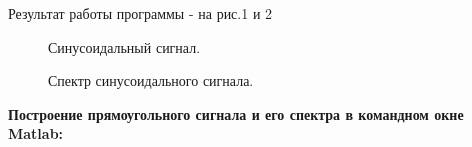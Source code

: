 \documentclass[12pt,a4paper]{report}
\begin{document}
Результат работы программы - на рис.1 и 2\\
\begin{figure}[h!]
\caption{Синусоидальный сигнал.}
\end{figure}
\begin{figure}[h!]
\caption{Спектр синусоидального сигнала.}
\end{figure}
\newpage
\textbf{Построение прямоугольного сигнала и его спектра в командном окне Matlab:\\}
\end{document}
